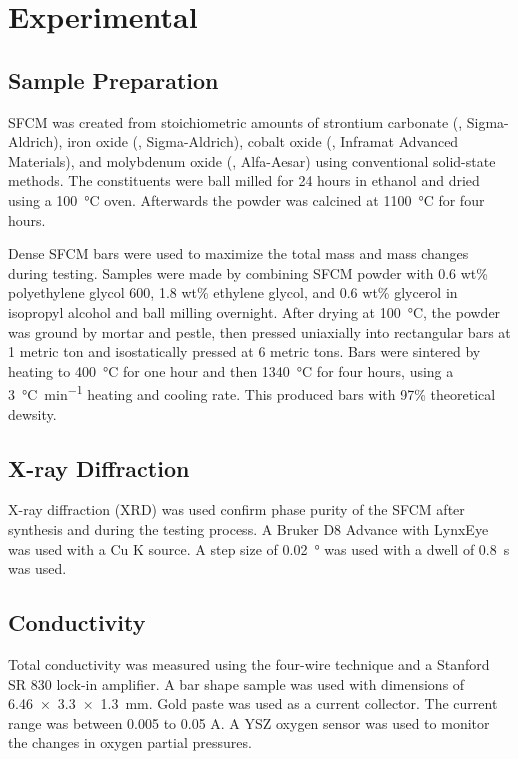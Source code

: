\section{Experimental}
    \subsection{Sample Preparation}
        SFCM was created from stoichiometric amounts of strontium carbonate (, Sigma-Aldrich), iron oxide (, Sigma-Aldrich), cobalt oxide (, Inframat Advanced Materials), and molybdenum oxide (, Alfa-Aesar) using conventional solid-state methods.
        The constituents were ball milled for 24 hours in ethanol and dried using a \SI{100}{\celsius} oven.
        Afterwards the powder was calcined at \SI{1100}{\celsius} for four hours.

        Dense SFCM bars were used to maximize the total mass and mass changes during testing.
        Samples were made by combining SFCM powder with 0.6 wt\% polyethylene glycol 600, 1.8 wt\% ethylene glycol, and 0.6 wt\% glycerol in isopropyl alcohol and ball milling overnight.
        After drying at \SI{100}{\celsius}, the powder was ground by mortar and pestle, then pressed uniaxially into rectangular bars at 1 metric ton and isostatically pressed at 6 metric tons.
        Bars were sintered by heating to \SI{400}{\celsius} for one hour and then \SI{1340}{\celsius} for four hours, using a \SI{3}{\celsius\per\minute} heating and cooling rate.
        This produced bars with 97\% theoretical dewsity.

    \subsection{X-ray Diffraction}
        X-ray diffraction (XRD) was used confirm phase purity of the SFCM after synthesis and during the testing process.
        A Bruker D8 Advance with LynxEye was used with a Cu K\textsubscript{\textalpha{}} source.
        A step size of \SI{0.02}{\degree} was used with a dwell of \SI{0.8}{\second} was used.

    \subsection{Conductivity}
        Total conductivity was measured using the four-wire technique and a Stanford SR 830 lock-in amplifier.
        A bar shape sample was used with dimensions of \SI{6.46x3.3x1.3}{\milli\meter}.
        Gold paste was used as a current collector.
        The current range was between 0.005 to 0.05 A.
        A YSZ oxygen sensor was used to monitor the changes in oxygen partial pressures.

